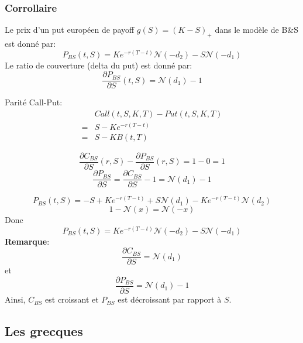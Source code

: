 \documentclass{article}
\theoremstyle{plain}
\theoremstyle{definition}
\begin{document}
\subsubsection{Corrollaire}
Le prix d'un put europ\'een de payoff $g(S)=(K-S)_+$ dans le mod\`ele de B\&S est donn\'e par:
\begin{equation}
P_{BS}(t,S)=Ke^{-r(T-t)}\mathcal{N}(-d_2)-S\mathcal{N}(-d_1)
\end{equation}
Le ratio de couverture (delta du put) est donn\'e par:
\begin{equation}
\frac{\partial P_{BS}}{\partial S}(t,S)=\mathcal{N}(d_1)-1 
\end{equation}

Parit\'e Call-Put:
\begin{equation}
\begin{split}
&Call(t,S,K,T)-Put(t,S,K,T)\\
=& S-Ke^{-r(T-t)}\\
=&S-KB(t,T)
\end{split}
\end{equation}

\begin{equation}
\frac{\partial C_{BS}}{\partial S}(r,S)-\frac{\partial P_{BS}}{\partial S}(r,S) = 1-0=1
\end{equation}
\begin{equation}
\frac{\partial P_{BS}}{\partial S} = \frac{\partial C_{BS}}{\partial S}-1=\mathcal{N}(d_1)-1
\end{equation}

\begin{equation}
P_{BS}(t,S)=-S+Ke^{-r(T-t)}+S\mathcal{N}(d_1)-Ke^{-r(T-t)}\mathcal{N}(d_2)
\end{equation}
\begin{equation}
1-\mathcal{N}(x)=\mathcal{N}(-x)
\end{equation}
Donc 
\begin{equation}
P_{BS}(t,S)=Ke^{-r(T-t)}\mathcal{N}(-d_2)-S\mathcal{N}(-d_1)
\end{equation}
\textbf{Remarque}:
\begin{equation}
\frac{\partial C_{BS}}{\partial S}=\mathcal{N}(d_1)
\end{equation}
et
\begin{equation}
\frac{\partial P_{BS}}{\partial S}=\mathcal{N}(d_1)-1
\end{equation}
Ainsi, $C_{BS}$ est croissant et $P_{BS}$ est d\'ecroissant par rapport \`a $S$.

\subsection{Les grecques}
\end{document}
